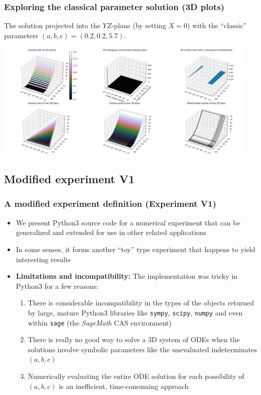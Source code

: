 \documentclass[usenames,svgnames,dvipsnames,10pt]{beamer}
\begin{document}
\begin{frame}[fragile]
\frametitle{Exploring the classical parameter solution (3D plots)}

The solution projected into the $YZ$-plane (by setting $X=0$) with the ``classic'' 
parameters $(a, b, c) = (0.2, 0.2, 5.7)$. \\ 
\begin{center}
\includegraphics[width=0.95\textwidth]{../Images/RosslerAttractorSummary-TypeYZ-Plot3D-A0-200B0-200C5-700-2021-10-27-045026.png}
\end{center}

\end{frame}

\subsection{Modified experiment V1}

\begin{frame}
\frametitle{A modified experiment definition (Experiment V1)}

\begin{itemize} 

\item We present Python3 source code for a numerical experiment 
      that can be generalized and extended for use in other related applications 
\item In some senses, it forms another ``toy'' type experiment that happens to yield interesting results
\item \textbf{Limitations and incompatibility:} The implementation was tricky in Python3 for a few reasons: 
      \begin{enumerate} 
      \item There is considerable incompatibility in the types of the objects returned by large, mature Python3 libraries like 
            \texttt{sympy}, \texttt{scipy}, \texttt{numpy} and even within \texttt{sage} (the \emph{SageMath} CAS environment) 
      \item There is really no good way to solve a 3D system of ODEs when the solutions involve symbolic parameters 
            like the unevaluated indeterminates $(a, b, c)$ 
      \item Numerically evaluating the entire ODE solution for each possibility of $(a, b, c)$ is an inefficient, time-consuming 
            approach
      \end{enumerate}

\end{itemize}

\end{frame}
\end{document}
